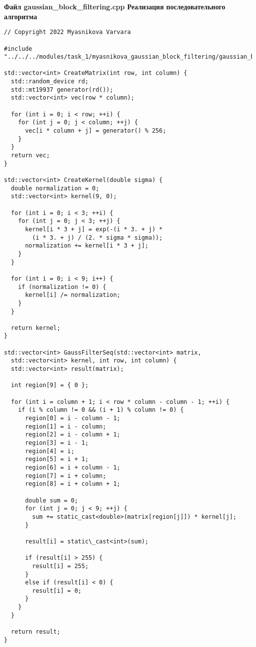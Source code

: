 \documentclass{report}
\begin{document}
\textbf{ Файл gaussian\_block\_filtering.cpp Реализация последовательного алгоритма}
\begin{lstlisting}
// Copyright 2022 Myasnikova Varvara

#include "../../../modules/task_1/myasnikova_gaussian_block_filtering/gaussian_block_filtering.h"

std::vector<int> CreateMatrix(int row, int column) {
  std::random_device rd;
  std::mt19937 generator(rd());
  std::vector<int> vec(row * column);

  for (int i = 0; i < row; ++i) {
    for (int j = 0; j < column; ++j) {
      vec[i * column + j] = generator() % 256;
    }
  }
  return vec;
}

std::vector<int> CreateKernel(double sigma) {
  double normalization = 0;
  std::vector<int> kernel(9, 0);

  for (int i = 0; i < 3; ++i) {
    for (int j = 0; j < 3; ++j) {
      kernel[i * 3 + j] = exp(-(i * 3. + j) *
        (i * 3. + j) / (2. * sigma * sigma));
      normalization += kernel[i * 3 + j];
    }
  }

  for (int i = 0; i < 9; i++) {
    if (normalization != 0) {
      kernel[i] /= normalization;
    }
  }

  return kernel;
}

std::vector<int> GaussFilterSeq(std::vector<int> matrix,
  std::vector<int> kernel, int row, int column) {
  std::vector<int> result(matrix);

  int region[9] = { 0 };

  for (int i = column + 1; i < row * column - column - 1; ++i) {
    if (i % column != 0 && (i + 1) % column != 0) {
      region[0] = i - column - 1;
      region[1] = i - column;
      region[2] = i - column + 1;
      region[3] = i - 1;
      region[4] = i;
      region[5] = i + 1;
      region[6] = i + column - 1;
      region[7] = i + column;
      region[8] = i + column + 1;

      double sum = 0;
      for (int j = 0; j < 9; ++j) {
        sum += static_cast<double>(matrix[region[j]]) * kernel[j];
      }

      result[i] = static\_cast<int>(sum);

      if (result[i] > 255) {
        result[i] = 255;
      }
      else if (result[i] < 0) {
        result[i] = 0;
      }
    }
  }

  return result;
}

\end{lstlisting}
\end{document}
